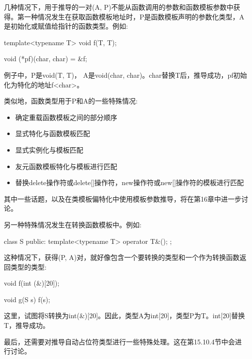几种情况下，用于推导的一对(A, P)不能从函数调用的参数和函数模板参数中获得。第一种情况发生在获取函数模板地址时，P是函数模板声明的参数化类型，A是初始化或赋值给指针的函数类型。例如:

\begin{cpp}
template<typename T>
void f(T, T);

void (*pf)(char, char) = &f;
\end{cpp}

例子中，P是void(T, T)， A是void(char, char)。char替换T后，推导成功，pf初始化为特化的地址f<char>。

类似地，函数类型用于P和A的一些特殊情况:

\begin{itemize}
\item 
确定重载函数模板之间的部分顺序

\item 
显式特化与函数模板匹配

\item 
显式实例化与模板匹配

\item 
友元函数模板特化与模板进行匹配

\item 
替换delete操作符或delete[]操作符，new操作符或new[]操作符的模板进行匹配
\end{itemize}

其中一些话题，以及在类模板偏特化中使用模板参数推导，将在第16章中进一步讨论。

另一种特殊情况发生在转换函数模板中。例如:

\begin{cpp}
class S {
	public:
	template<typename T> operator T&();
};
\end{cpp}

这种情况下，获得(P, A)对，就好像包含一个要转换的类型和一个作为转换函数返回类型的类型:

\begin{cpp}
void f(int (&)[20]);

void g(S s)
{
	f(s);
}
\end{cpp}

这里，试图将S转换为int(\&)[20]。因此，类型A为int[20]，类型P为T。int[20]替换T，推导成功。

最后，还需要对推导自动占位符类型进行一些特殊处理。这在第15.10.4节中会进行讨论。


































